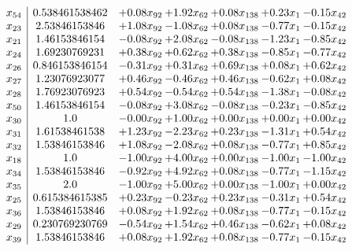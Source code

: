 \documentclass[8pt]{article}
\begin{document}
\[\begin{array}{c| c c@{\hskip 2pt} c@{\hskip 2pt} c@{\hskip 2pt} c@{\hskip 2pt} c@{\hskip 2pt} }
 x_{54}   &  0.538461538462 & +  0.08 x_{92} & +  1.92 x_{62} & +  0.08 x_{138} & +  0.23 x_{1} & -0.15 x_{42}\\
 x_{23}   &  2.53846153846 & +  1.08 x_{92} & -1.08 x_{62} & +  0.08 x_{138} & -0.77 x_{1} & -0.15 x_{42}\\
 x_{21}   &  1.46153846154 & -0.08 x_{92} & +  2.08 x_{62} & -0.08 x_{138} & -1.23 x_{1} & -0.85 x_{42}\\
 x_{24}   &  1.69230769231 & +  0.38 x_{92} & +  0.62 x_{62} & +  0.38 x_{138} & -0.85 x_{1} & -0.77 x_{42}\\
 x_{26}   &  0.846153846154 & -0.31 x_{92} & +  0.31 x_{62} & +  0.69 x_{138} & +  0.08 x_{1} & +  0.62 x_{42}\\
 x_{27}   &  1.23076923077 & +  0.46 x_{92} & -0.46 x_{62} & +  0.46 x_{138} & -0.62 x_{1} & +  0.08 x_{42}\\
 x_{28}   &  1.76923076923 & +  0.54 x_{92} & -0.54 x_{62} & +  0.54 x_{138} & -1.38 x_{1} & -0.08 x_{42}\\
 x_{50}   &  1.46153846154 & -0.08 x_{92} & +  3.08 x_{62} & -0.08 x_{138} & -0.23 x_{1} & -0.85 x_{42}\\
 x_{30}   &  1.0 & -0.00 x_{92} & +  1.00 x_{62} & +  0.00 x_{138} & +  0.00 x_{1} & +  0.00 x_{42}\\
 x_{31}   &  1.61538461538 & +  1.23 x_{92} & -2.23 x_{62} & +  0.23 x_{138} & -1.31 x_{1} & +  0.54 x_{42}\\
 x_{32}   &  1.53846153846 & +  1.08 x_{92} & -2.08 x_{62} & +  0.08 x_{138} & -0.77 x_{1} & +  0.85 x_{42}\\
 x_{18}   &  1.0 & -1.00 x_{92} & +  4.00 x_{62} & +  0.00 x_{138} & -1.00 x_{1} & -1.00 x_{42}\\
 x_{34}   &  1.53846153846 & -0.92 x_{92} & +  4.92 x_{62} & +  0.08 x_{138} & -0.77 x_{1} & -1.15 x_{42}\\
 x_{35}   &  2.0 & -1.00 x_{92} & +  5.00 x_{62} & +  0.00 x_{138} & -1.00 x_{1} & +  0.00 x_{42}\\
 x_{25}   &  0.615384615385 & +  0.23 x_{92} & -0.23 x_{62} & +  0.23 x_{138} & -0.31 x_{1} & +  0.54 x_{42}\\
 x_{36}   &  1.53846153846 & +  0.08 x_{92} & +  1.92 x_{62} & +  0.08 x_{138} & -0.77 x_{1} & -0.15 x_{42}\\
 x_{29}   &  0.230769230769 & -0.54 x_{92} & +  1.54 x_{62} & +  0.46 x_{138} & -0.62 x_{1} & +  0.08 x_{42}\\
 x_{39}   &  1.53846153846 & +  0.08 x_{92} & +  1.92 x_{62} & +  0.08 x_{138} & -0.77 x_{1} & -0.15 x_{42}\\

\end{array}\]
\end{document}
